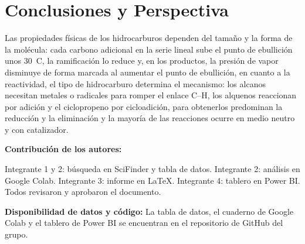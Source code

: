 \documentclass[twoside,twocolumn,10pt]{article}
\begin{document}
\section{Conclusiones y Perspectiva}
\fontsize{12}{14}\selectfont
Las propiedades físicas de los hidrocarburos dependen del tamaño y la forma de la molécula: cada carbono adicional en la serie lineal sube el punto de ebullición unos 30~\textdegree C, la ramificación lo reduce y, en los productos, la presión de vapor disminuye de forma marcada al aumentar el punto de ebullición, en cuanto a la reactividad, el tipo de hidrocarburo determina el mecanismo: los alcanos necesitan metales o radicales para romper el enlace C–H, los alquenos reaccionan por adición y el ciclopropeno por cicloadición, para obtenerlos predominan la reducción y la eliminación y la mayoría de las reacciones ocurre en medio neutro y con catalizador.


\textbf{Contribución de los autores:}

Integrante 1 y  2: búsqueda en SciFinder y tabla de datos. Integrante 2: análisis en Google Colab. Integrante 3: informe en LaTeX. Integrante 4: tablero en Power BI. Todos revisaron y aprobaron el documento.

\textbf{Disponibilidad de datos y código:} La tabla de datos, el cuaderno de Google Colab y el tablero de Power BI se encuentran en el repositorio de GitHub del grupo.

\printbibliography
\end{document}
